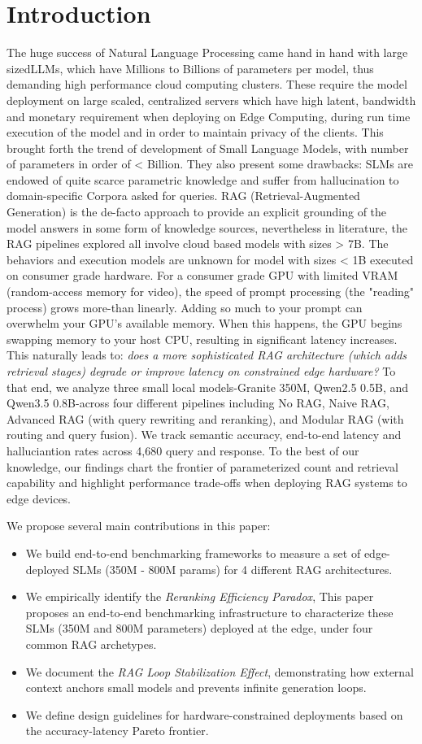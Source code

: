 \documentclass[conference]{IEEEtran}
\begin{document}
\section{Introduction}
The huge success of Natural Language Processing came hand in hand with large sizedLLMs, which have Millions to Billions of parameters per model, thus demanding high performance cloud computing clusters. These require the model deployment on large scaled, centralized servers which have high latent, bandwidth and monetary requirement when deploying on Edge Computing, during run time execution of the model and in order to maintain privacy of the clients. This brought forth the trend of development of Small Language Models, with number of parameters in order of < Billion.
They also present some drawbacks: SLMs are endowed of quite scarce parametric knowledge and suffer from hallucination to domain-specific Corpora asked for queries. RAG (Retrieval-Augmented Generation) is the de-facto approach to provide an explicit grounding of the model answers in some form of knowledge sources, nevertheless in literature, the RAG pipelines explored all involve cloud based models with sizes > 7B. The behaviors and execution models are unknown for model with sizes < 1B executed on consumer grade hardware.
For a consumer grade GPU with limited VRAM (random-access memory for video), the speed of prompt processing (the "reading" process) grows more-than linearly. Adding so much to your prompt can overwhelm your GPU's available memory. When this happens, the GPU begins swapping memory to your host CPU, resulting in significant latency increases. This naturally leads to: \textit{does a more sophisticated RAG architecture (which adds retrieval stages) degrade or improve latency on constrained edge hardware?}
To that end, we analyze three small local models-Granite 350M, Qwen2.5 0.5B, and Qwen3.5 0.8B-across four different pipelines including No RAG, Naive RAG, Advanced RAG (with query rewriting and reranking), and Modular RAG (with routing and query fusion). We track semantic accuracy, end-to-end latency and halluciantion rates across 4,680 query and response. To the best of our knowledge, our findings chart the frontier of parameterized count and retrieval capability and highlight performance trade-offs when deploying RAG systems to edge devices.

We propose several main contributions in this paper:
\begin{itemize}
    \item We build end-to-end benchmarking frameworks to measure a set of edge-deployed SLMs (350M - 800M params) for 4 different RAG architectures.
    \item We empirically identify the \textit{Reranking Efficiency Paradox}, This paper proposes an end-to-end benchmarking infrastructure to characterize these SLMs (350M and 800M parameters) deployed at the edge, under four common RAG archetypes.
    \item We document the \textit{RAG Loop Stabilization Effect}, demonstrating how external context anchors small models and prevents infinite generation loops.
    \item We define design guidelines for hardware-constrained deployments based on the accuracy-latency Pareto frontier.
\end{itemize}
\end{document}
